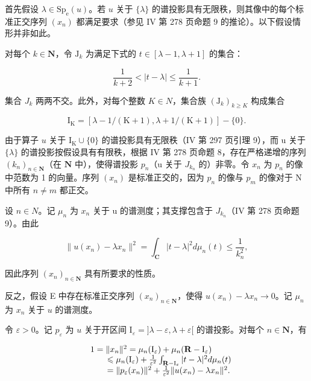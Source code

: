 首先假设 \(\lambda \in \mathrm{Sp}_{\mathrm{e}}(u)\)。若 \(u\) 关于 \(\{\lambda\}\) 的谱投影具有无限秩，则其像中的每个标准正交序列 \((x_{n})\) 都满足要求（参见 IV 第 278 页命题 9 的推论）。以下假设情形并非如此。

对每个 \(k \in \mathbf{N}\)，令 \(\mathrm{J}_k\) 为满足下式的 \(t \in [\lambda - 1, \lambda + 1]\) 的集合：

\[
{\frac {1}{k + 2}} <   | t - \lambda | \leqslant {\frac {1}{k + 1}}.
\]

集合 \(J_{k}\) 两两不交。此外，对每个整数 \(K \in N\)，集合族 \((\mathrm{J}_{k})_{k \geqslant K}\) 构成集合

\[
\mathrm{I} _ {\mathrm{K}} = [ \lambda - 1 / (\mathrm{K} + 1), \lambda + 1 / (\mathrm{K} + 1) ] - \{0 \}.
\]

 由于算子 \(u\) 关于 \(\mathrm{I_K} \cup \{0\}\) 的谱投影具有无限秩（IV 第 297 页引理 9），而 u 关于 \(\{\lambda\}\) 的谱投影按假设具有有限秩，根据 IV 第 278 页命题 8，存在严格递增的序列 \((k_n)_{n \in \mathbf{N}}\)（在 \(\mathbf{N}\) 中），使得谱投影 \(p_{n}\)（u 关于 \(J_{k_{n}}\) 的）非零。令 \(x_{n}\) 为 \(p_{n}\) 的像中范数为 1 的向量。序列 \((x_{n})\) 是标准正交的，因为 \(p_{n}\) 的像与 \(p_{m}\) 的像对于 N 中所有 \(n \neq m\) 都正交。

设 \(n \in N\)。记 \(\mu_{n}\) 为 \(x_{n}\) 关于 u 的谱测度；其支撑包含于 \(J_{k_{n}}\)（IV 第 278 页命题 9）。由此

\[
\| u (x _ {n}) - \lambda x _ {n} \| ^ {2} = \int_ {\mathbf {C}} | t - \lambda | ^ {2} d \mu_ {n} (t) \leqslant \frac {1}{k _ {n} ^ {2}},
\]

因此序列 \((x_{n})_{n\in\mathbf{N}}\) 具有所要求的性质。

反之，假设 E 中存在标准正交序列 \((x_{n})_{n\in \mathbf{N}}\)，使得 \(u(x_{n}) - \lambda x_{n}\to 0\)。记 \(\mu_{n}\) 为 \(x_{n}\) 关于 \(u\) 的谱测度。

令 \(\varepsilon > 0\)。记 \(p_{\varepsilon}\) 为 \(u\) 关于开区间 \(\mathrm{I}_{\varepsilon} = ]\lambda - \varepsilon, \lambda + \varepsilon[\) 的谱投影。对每个 \(n \in \mathbf{N}\)，有

\[
\begin{array}{r l} & 1 = \| x _ {n} \| ^ {2} = \mu_ {n} (\mathrm{I} _ {\varepsilon}) + \mu_ {n} (\mathbf {R} - \mathrm{I} _ {\varepsilon}) \\ & \qquad \leqslant \mu_ {n} (\mathrm{I} _ {\varepsilon}) + \frac {1}{\varepsilon^ {2}} \int_ {\mathbf {R} - \mathrm{I} _ {\varepsilon}} | t - \lambda | ^ {2} d \mu_ {n} (t) \\ & \qquad = \| p _ {\varepsilon} (x _ {n}) \| ^ {2} + \frac {1}{\varepsilon^ {2}} \| u (x _ {n}) - \lambda x _ {n} \| ^ {2}. \end{array}
\]

